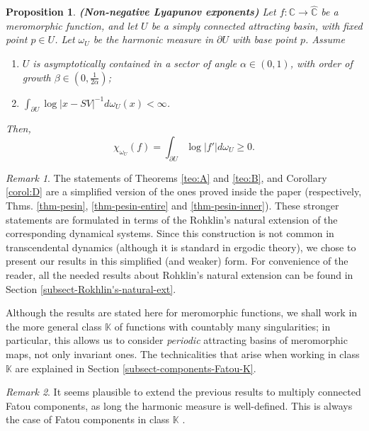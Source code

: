 \documentclass[11pt]{article}
\theoremstyle{definition}
\theoremstyle{remark}
\newtheorem*{remark*}{Remark}
\newcounter{main}
\theoremstyle{plain}
\newtheorem{mainprop}[main]{Proposition}
\begin{document}
\begin{mainprop}\label{prop:E}{\bf (Non-negative Lyapunov exponents)}\label{prop-non-negative-lyapunov}
		Let $ f\colon\mathbb{C}\to\widehat{\mathbb{C}}$ be a meromorphic function, and let $ U $ be a simply connected attracting basin, with fixed point $ p\in U $. Let $ \omega_U $ be the harmonic measure in $ \partial U $ with base point $ p $.  Assume\begin{enumerate}[label={\em (\alph*)}]
		\item $ U $ is asymptotically contained in a sector of angle $ \alpha\in \left( 0, 1\right)  $, with order of growth $ \beta\in(0, \frac1{2\alpha}) $;
		\item $ \int_{\partial U} \log\left| x-SV\right|^{-1} d\omega_U(x)<\infty  $.
	\end{enumerate}
	Then, \[\chi_{\omega_U}(f)=\int_{\partial U}\log \left| f'\right| d\omega_U\geq 0.\]
\end{mainprop}



\begin{remark*}
	The statements of Theorems \ref{teo:A} and \ref{teo:B}, and Corollary \ref{corol:D} are a simplified version of the ones proved inside the paper (respectively, Thms. \ref{thm-pesin}, \ref{thm-pesin-entire} and \ref{thm-pesin-inner}). These stronger statements are formulated in terms of the Rohklin's natural extension of the corresponding dynamical systems. Since this construction is not common in transcendental dynamics (although it is standard in ergodic theory), we chose to present our results in this simplified (and weaker) form.  For convenience of the reader, all the needed results about Rohklin's natural extension can be found in Section \ref{subsect-Rokhlin's-natural-ext}. 
	
	Although the results are stated here for meromorphic functions, we shall work in the more general class $ \mathbb{K} $ of functions with countably many singularities; in particular, this allows us to consider \textit{periodic} attracting basins of meromorphic maps, not only invariant ones. The technicalities that arise when working in class  $ \mathbb{K} $ are explained in Section \ref{subsect-components-Fatou-K}. 
\end{remark*}

\begin{remark*}
	It seems plausible to extend the previous results to multiply connected Fatou components, as long the harmonic measure is well-defined. This is always the case of Fatou components in class $ \mathbb{K} $ \cite{FerreiraJove}.
\end{remark*}
\end{document}
